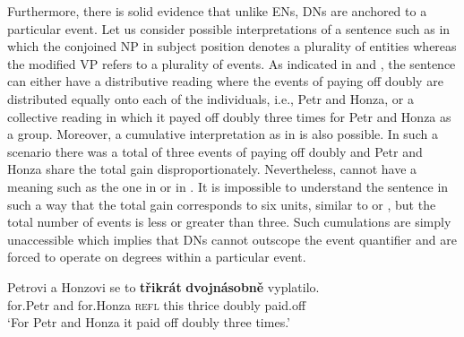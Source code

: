 \documentclass[output=paper,
modfonts,
hidelinks,
newtxmath
]{langscibook}
\begin{document}
\ea {}
\z \z

\noindent Furthermore, there is solid evidence that unlike ENs, DNs are anchored to a particular event. Let us consider possible interpretations of a sentence such as  in which the conjoined NP in subject position denotes a plurality of entities whereas the modified VP refers to a plurality of events. As indicated in  and , the sentence can either have a distributive reading where the events of paying off doubly are distributed equally onto each of the individuals, i.e., Petr and Honza, or a collective reading in which it payed off doubly three times for Petr and Honza as a group. Moreover, a cumulative interpretation as in  is also possible. In such a scenario there was a total of three events of paying off doubly and Petr and Honza share the total gain disproportionately. Nevertheless,  cannot have a meaning such as the one in  or in . It is impossible to understand the sentence in such a way that the total gain corresponds to six units, similar to  or , but the total number of events is less or greater than three. Such cumulations are simply unaccessible which implies that DNs cannot outscope the event quantifier and are forced to operate on degrees within a particular event.

\ea\label{stacked-numerals-int} 
\gll Petrovi a Honzovi se to \textbf{třikrát} \textbf{dvojnásobně} vyplatilo.\\
for.Petr and for.Honza \textsc{refl} this thrice doubly paid.off\\
\glt `For Petr and Honza it paid off doubly three times.'
\z \z
\end{document}
